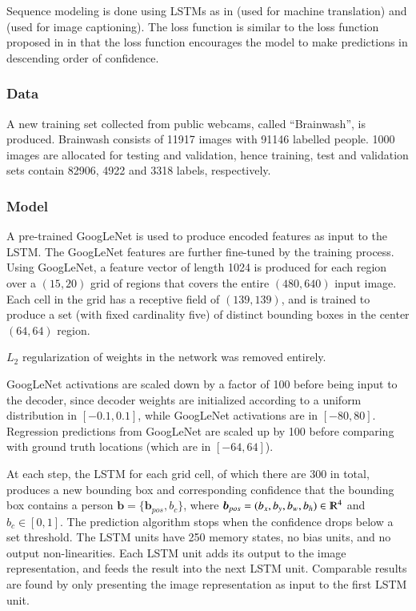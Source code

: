 \documentclass[a4paper, 12pt]{article}
\begin{document}
Sequence modeling is done using LSTMs as in
\citet{DBLP:journals/corr/SutskeverVL14} (used for machine translation) and
\citet{DBLP:journals/corr/KarpathyF14} (used for image captioning). The loss
function is similar to the loss function proposed in
\citet{Graves06connectionisttemporal} in that the loss function encourages the
model to make predictions in descending order of confidence.

\subsubsection{Data}

A new training set collected from public webcams, called ``Brainwash'', is
produced. Brainwash consists of 11917 images with 91146 labelled people. 1000
images are allocated for testing and validation, hence training, test and
validation sets contain 82906, 4922 and 3318 labels, respectively.

\subsubsection{Model}

A pre-trained GoogLeNet\citet{going-deeper-szegedy43022} is used to produce
encoded features as input to the LSTM\@. The GoogLeNet features are further
fine-tuned by the training process.  Using GoogLeNet, a feature vector of
length 1024 is produced for each region over a $(15, 20)$ grid of regions that
covers the entire $(480, 640)$ input image. Each cell in the grid has a
receptive field of $(139, 139)$, and is trained to produce a set (with fixed
cardinality five) of distinct bounding boxes in the center $(64, 64)$ region.

$L_2$ regularization of weights in the network was removed entirely.

GoogLeNet activations are scaled down by a factor of 100 before being input to
the decoder, since decoder weights are initialized according to a uniform
distribution in $[-0.1, 0.1]$, while GoogLeNet activations are in $[-80, 80]$.
Regression predictions from GoogLeNet are scaled up by 100 before comparing
with ground truth locations (which are in $[-64, 64]$).

At each step, the LSTM for each grid cell, of which there are 300 in total,
produces a new bounding box and corresponding confidence that the bounding box
contains a person $\boldsymbol{b} = \{\boldsymbol{b}_{pos}, b_c\}$, where
$\boldsymbol{b}_{pos} = (b_x, b_y, b_w, b_h) \in \varmathbb{R}^4$ and
$b_c \in [0, 1]$. The prediction algorithm stops when the confidence drops
below a set threshold. The LSTM units have 250 memory states, no bias units,
and no output non-linearities. Each LSTM unit adds its output to the image
representation, and feeds the result into the next LSTM unit. Comparable
results are found by only presenting the image representation as input to the
first LSTM unit.
\end{document}
